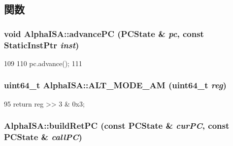 \subsection{関数}
\hypertarget{namespaceAlphaISA_add1b209af0281827d9ac0a67747a3bf7}{
\subsubsection[{advancePC}]{\setlength{\rightskip}{0pt plus 5cm}void AlphaISA::advancePC (PCState \& {\em pc}, \/  const {\bf StaticInstPtr} {\em inst})}}
\label{namespaceAlphaISA_add1b209af0281827d9ac0a67747a3bf7}



\begin{DoxyCode}
109 {
110     pc.advance();
111 }
\end{DoxyCode}
\hypertarget{namespaceAlphaISA_aea45c43f418ab3870323f1826f2a5038}{
\subsubsection[{ALT\_\-MODE\_\-AM}]{\setlength{\rightskip}{0pt plus 5cm}uint64\_\-t AlphaISA::ALT\_\-MODE\_\-AM (uint64\_\-t {\em reg})}}
\label{namespaceAlphaISA_aea45c43f418ab3870323f1826f2a5038}



\begin{DoxyCode}
95 { return reg >> 3 & 0x3; }
\end{DoxyCode}
\hypertarget{namespaceAlphaISA_a7480844aa2eaec6bd5e60412bf6c4a38}{
\subsubsection[{buildRetPC}]{ AlphaISA::buildRetPC (const PCState \& {\em curPC}, \/  const PCState \& {\em callPC})}}
\label{namespaceAlphaISA_a7480844aa2eaec6bd5e60412bf6c4a38}



